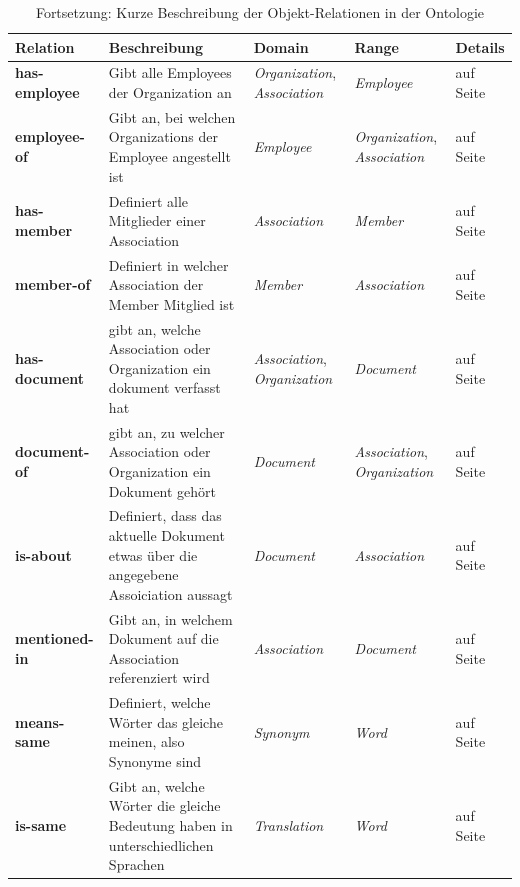 \documentclass[draft,
    11pt,
    latin1,
    a4paper,
    oneside
]{scrreprt}
\let\oldemph=\emph
\renewcommand{\emph}[1]{\index{#1}\oldemph{#1}}
\begin{document}
\begin{table}[H]
  \centering
  \begin{tabular}{ | l | p{4cm} | p{3cm} | p{2cm} | p{2cm} | }
    \hline
    \textbf{Relation} & \textbf{Beschreibung} & \textbf{Domain} & \textbf{Range} & \textbf{Details} \\ \hline
    \textbf{has-employee} & Gibt alle Employees der Organization an & \emph{Organization}, \emph{Association} & \emph{Employee} & \nameref{sec:rel_hasemployee} auf Seite \pageref{sec:rel_hasemployee} \\ \hline
    \textbf{employee-of} & Gibt an, bei welchen Organizations der Employee angestellt ist & \emph{Employee} & \emph{Organization}, \emph{Association} & \nameref{sec:rel_employeeof} auf Seite \pageref{sec:rel_employeeof} \\ \hline
    \textbf{has-member} & Definiert alle Mitglieder einer Association & \emph{Association} & \emph{Member} & \nameref{sec:rel_hasmember} auf Seite \pageref{sec:rel_hasmember} \\ \hline
    \textbf{member-of} & Definiert in welcher Association der Member Mitglied ist & \emph{Member} & \emph{Association} & \nameref{sec:rel_memberof} auf Seite \pageref{sec:rel_memberof} \\ \hline
    \textbf{has-document} & gibt an, welche Association oder Organization ein dokument verfasst hat & \emph{Association}, \emph{Organization} & \emph{Document} & \nameref{sec:rel_hasdocument} auf Seite \pageref{sec:rel_hasdocument} \\ \hline
    \textbf{document-of} & gibt an, zu welcher Association oder Organization ein Dokument geh\"ort & \emph{Document} & \emph{Association}, \emph{Organization} & \nameref{sec:rel_documentof} auf Seite \pageref{sec:rel_documentof} \\ \hline
    \textbf{is-about} & Definiert, dass das aktuelle Dokument etwas \"uber die angegebene Assoiciation aussagt & \emph{Document} & \emph{Association} & \nameref{sec:rel_isabout} auf Seite \pageref{sec:rel_isabout} \\ \hline
    \textbf{mentioned-in} & Gibt an, in welchem Dokument auf die Association referenziert wird & \emph{Association} & \emph{Document} & \nameref{sec:rel_mentionedin} auf Seite \pageref{sec:rel_mentionedin} \\ \hline
    \textbf{means-same} & Definiert, welche W\"orter das gleiche meinen, also Synonyme sind & \emph{Synonym} & \emph{Word} & \nameref{sec:rel_meanssame} auf Seite \pageref{sec:rel_meanssame} \\ \hline
    \textbf{is-same} & Gibt an, welche W\"orter die gleiche Bedeutung haben in unterschiedlichen Sprachen & \emph{Translation} & \emph{Word} & \nameref{sec:rel_issame} auf Seite \pageref{sec:rel_issame} \\ \hline
  \end{tabular}
  \caption{Fortsetzung: Kurze Beschreibung der Objekt-Relationen in der Ontologie}
  \label{tbl:relations2}
\end{table}
\end{document}
